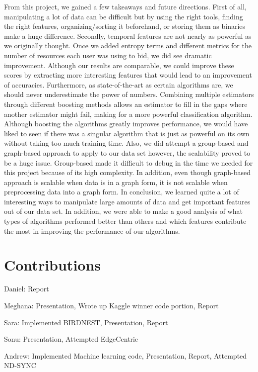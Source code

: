 \documentclass{article} %
\begin{document}
From this project, we gained a few takeaways and future directions. First of all, manipulating a lot of data can be difficult but by using the right tools, finding the right features, organizing/sorting it beforehand, or storing them as binaries make a huge difference. Secondly, temporal features are not nearly as powerful as we originally thought. Once we added entropy terms and different metrics for the number of resources each user was using to bid, we did see dramatic improvement. Although our results are comparable, we could improve these scores by extracting more interesting features that would lead to an improvement of accuracies. Furthermore, as state-of-the-art as certain algorithms are, we should never underestimate the power of numbers. Combining multiple estimators through different boosting methods allows an estimator to fill in the gaps where another estimator might fail, making for a more powerful classification algorithm. Although boosting the algorithms greatly improves performance, we would have liked to seen if there was a singular algorithm that is just as powerful on its own without taking too much training time. Also, we did attempt a group-based and graph-based approach to apply to our data set however, the scalability proved to be a huge issue. Group-based made it difficult to debug in the time we needed for this project because of its high complexity. In addition, even though graph-based approach is scalable when data is in a graph form, it is not scalable when preprocessing data into a graph form. In conclusion, we learned quite a lot of interesting ways to manipulate large amounts of data and get important features out of our data set. In addition, we were able to make a good analysis of what types of algorithms performed better than others and which features contribute the most in improving the performance of our algorithms.

\section{Contributions}

Daniel: Report

Meghana: Presentation, Wrote up Kaggle winner code portion, Report

Sara: Implemented BIRDNEST, Presentation, Report

Sonu: Presentation, Attempted EdgeCentric 

Andrew: Implemented Machine learning code, Presentation, Report, Attempted ND-SYNC
\end{document}
